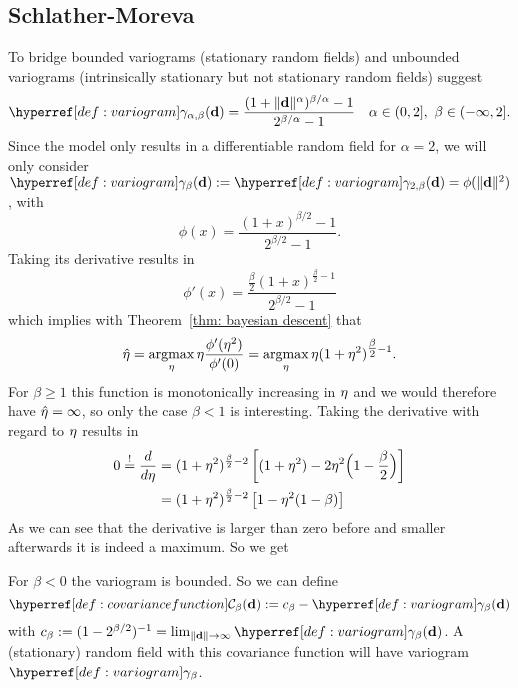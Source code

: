 
\subsection{Schlather-Moreva}

To bridge bounded variograms (stationary random fields) and
unbounded variograms (intrinsically stationary but not stationary random fields)
\textcite{schlatherParametricModelBridging2017} suggest
\begin{equation*}
	\variogram_{\alpha,\beta}(\step)
	= \frac{(1+\|\step\|^\alpha)^{\beta/\alpha}-1}{2^{\beta/\alpha}-1}
	\quad \alpha\in (0,2],\ \beta\in(-\infty, 2].
\end{equation*}
Since the model only results in a differentiable random field for \(\alpha=2\),
we will only consider \(\variogram_\beta(\step) := \variogram_{2,\beta}(\step) =
\phi(\|\step\|^2)\), with
\begin{equation*}
	\phi(x) = \frac{(1+x)^{\beta/2} -1}{2^{\beta/2}-1}.
\end{equation*}
Taking its derivative results in
\begin{equation*}
	\phi'(x) = \frac{\tfrac\beta2 (1+x)^{\tfrac\beta2 -1}}{2^{\beta/2}-1}
\end{equation*}
which implies with Theorem~\ref{thm: bayesian descent} that
\begin{align*}
	\hat{\eta} = \operatorname*{argmax}_\eta \eta\frac{\phi'(\eta^2)}{\phi'(0)}
	= \operatorname*{argmax}_\eta \eta(1+\eta^2)^{\tfrac\beta2 -1}.
\end{align*}
For \(\beta \ge 1\) this function is monotonically increasing in \(\eta\) and
we would therefore have \(\hat{\eta} = \infty\), so only the case \(\beta <1\)
is interesting. Taking the derivative with regard to
\(\eta\) results in
\begin{align*}
	0 \overset!=\frac{d}{d\eta}
	&= (1+\eta^2)^{\frac\beta2 -2} \left[(1+\eta^2) - 2\eta^2\Big(1-\frac\beta2\Big)\right]\\
	&= (1+\eta^2)^{\frac\beta2 -2} \left[1 - \eta^2(1-\beta)\right]
\end{align*}
As we can see that the derivative is larger than zero before and smaller
afterwards it is indeed a maximum.
So we get


For \(\beta<0\) the variogram is bounded. So we can define
\[
	\C_\beta(\step) := c_\beta - \variogram_\beta(\step)
\]
with \(c_\beta := (1-2^{\beta/2})^{-1} =
\lim_{\|\step\|\to\infty}\variogram_\beta(\step)\). A (stationary) random
field with this covariance function will have variogram \(\variogram_\beta\).


